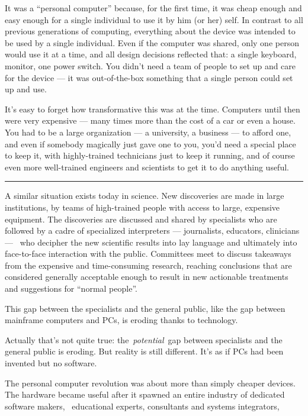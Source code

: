 \documentclass[
]{book}
\begin{document}
It was a ``personal computer'' because, for the first time, it was cheap enough and easy enough for a single individual to use it by him (or her) self. In contrast to all previous generations of computing, everything about the device was intended to be used by a single individual. Even if the computer was shared, only one person would use it at a time, and all design decisions reflected that: a single keyboard, monitor, one power switch. You didn't need a team of people to set up and care for the device --- it was out-of-the-box something that a single person could set up and use.

It's easy to forget how transformative this was at the time. Computers until then were very expensive --- many times more than the cost of a car or even a house. You had to be a large organization --- a university, a business --- to afford one, and even if somebody magically just gave one to you, you'd need a special place to keep it, with highly-trained technicians just to keep it running, and of course even more well-trained engineers and scientists to get it to do anything useful.

\begin{center}\rule{0.5\linewidth}{0.5pt}\end{center}

A similar situation exists today in science. New discoveries are made in large institutions, by teams of high-trained people with access to large, expensive equipment. The discoveries are discussed and shared by specialists who are followed by a cadre of specialized interpreters --- journalists, educators, clinicians --- ~who decipher the new scientific results into lay language and ultimately into face-to-face interaction with the public. Committees meet to discuss takeaways from the expensive and time-consuming research, reaching conclusions that are considered generally acceptable enough to result in new actionable treatments and suggestions for ``normal people''.

This gap between the specialists and the general public, like the gap between mainframe computers and PCs, is eroding thanks to technology.

Actually that's not quite true: the~\emph{potential}~gap between specialists and the general public is eroding. But reality is still different. It's as if PCs had been invented but no software.

The personal computer revolution was about more than simply cheaper devices. The hardware became useful after it spawned an entire industry of dedicated software makers, ~educational experts, consultants and systems integrators,
\end{document}
